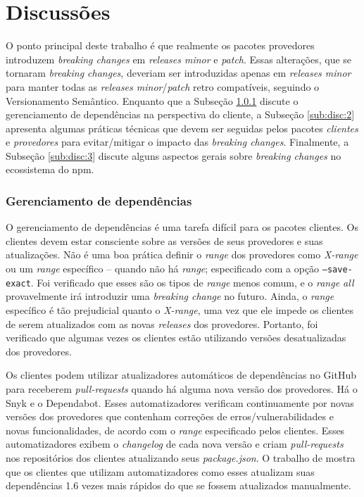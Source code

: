 \chapter{Discussões}
\label{cap:discussoes}

O ponto principal deste trabalho é que realmente os pacotes provedores introduzem \textit{breaking changes} em \textit{releases minor} e \textit{patch}. Essas alterações, que se tornaram \textit{breaking changes}, deveriam ser introduzidas apenas em \textit{releases minor} para manter todas as \textit{releases minor}/\textit{patch} retro compatíveis, seguindo o Versionamento Semântico. Enquanto que a Subseção \ref{sub:disc:1} discute o gerenciamento de dependências na perspectiva do cliente, a Subseção \ref{sub:disc:2} apresenta algumas práticas técnicas que devem ser seguidas pelos pacotes \textit{clientes} e \textit{provedores} para evitar/mitigar o impacto das \textit{breaking changes}. Finalmente, a Subseção \ref{sub:disc:3} discute alguns aspectos gerais sobre \textit{breaking changes} no ecossistema do \textsf{npm}.

\subsection{Gerenciamento de dependências}
\label{sub:disc:1}

O gerenciamento de dependências é uma tarefa difícil para os pacotes clientes. Os clientes devem estar consciente sobre as versões de seus provedores e suas atualizações. Não é uma boa prática definir o \textit{range} dos provedores como \textit{X-range} ou um \textit{range} específico -- quando não há \textit{range}; especificado com a opção \texttt{--save-exact}. Foi verificado que esses são os tipos de \textit{range} menos comum, e o \textit{range all} provavelmente irá introduzir uma \textit{breaking change} no futuro. Ainda, o \textit{range} específico é tão prejudicial quanto o \textit{X-range}, uma vez que ele impede os clientes de serem atualizados com as novas \textit{releases} dos provedores. Portanto, foi verificado que algumas vezes os clientes estão utilizando versões desatualizadas dos provedores.

Os clientes podem utilizar atualizadores automáticos de dependências no \textsf{GitHub} para receberem \textit{pull-requests} quando há alguma nova versão dos provedores. Há o \textsf{Snyk} e o \textsf{Dependabot}. Esses automatizadores verificam continuamente por novas versões dos provedores que contenham correções de erros/vulnerabilidades e novas funcionalidades, de acordo com o \textit{range} especificado pelos clientes. Esses automatizadores exibem o \textit{changelog} de cada nova versão e criam \textit{pull-requests} nos repositórios dos clientes atualizando seus \textit{package.json}. O trabalho de  mostra que os clientes que utilizam automatizadores como esses atualizam suas dependências 1.6 vezes mais rápidos do que se fossem atualizados manualmente.

